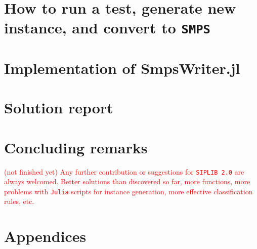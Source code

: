 \section{How to run a test, generate new instance, and convert to \texttt{SMPS}}\label{sec:tutorial}



\pagebreak

\section{Implementation of SmpsWriter.jl}\label{sec:smps_writer}

\pagebreak

\section{Solution report}\label{sec:solution}

\pagebreak

\section{Concluding remarks}
\textcolor{red}{(not finished yet) Any further contribution or suggestions for \texttt{SIPLIB 2.0} are always welcomed. Better solutions than discovered so far, more functions, more problems with \texttt{Julia} scripts for instance generation, more effective classification rules, etc.}
\pagebreak


\appendix
\section*{Appendices}




